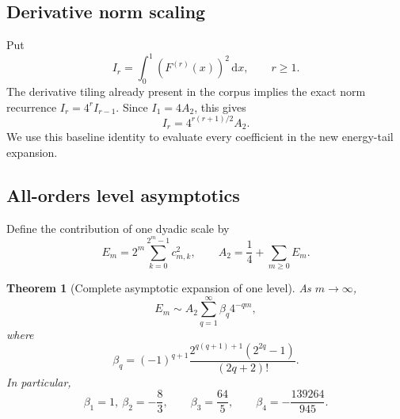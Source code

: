 \documentclass[11pt,oneside]{article}
\newtheorem{theorem}{Theorem}[section]
\theoremstyle{definition}
\newcommand{\dd}{\,\mathrm d}
\begin{document}
\subsection{Derivative norm scaling}

Put
\begin{equation}
 I_r=\int_0^1\left(F^{(r)}(x)\right)^2\dd x,
 \qquad r\ge1.                                           \label{p5:eq:Ir-definition}
\end{equation}
The derivative tiling already present in the corpus implies the exact norm
recurrence $I_r=4^rI_{r-1}$.  Since $I_1=4A_2$, this gives
\begin{equation}
 \boxed{\displaystyle
 I_r=4^{r(r+1)/2}A_2.}                                   \label{p5:eq:derivative-norm-scaling}
\end{equation}
We use this baseline identity to evaluate every coefficient in the new
energy-tail expansion.

\subsection{All-orders level asymptotics}

Define the contribution of one dyadic scale by
\begin{equation}
 E_m=2^m\sum_{k=0}^{2^m-1}c_{m,k}^2,
 \qquad A_2=\frac14+\sum_{m\ge0}E_m.                     \label{p5:eq:Em-definition}
\end{equation}

\begin{theorem}[Complete asymptotic expansion of one level]
\label{p5:thm:Em-asymptotic}
As $m\to\infty$,
\begin{equation}
 \boxed{\displaystyle
 E_m\sim A_2\sum_{q=1}^\infty\beta_q4^{-qm},}            \label{p5:eq:Em-asymptotic}
\end{equation}
where
\begin{equation}
 \boxed{\displaystyle
 \beta_q=(-1)^{q+1}
 \frac{2^{q(q+1)+1}(2^{2q}-1)}{(2q+2)!}.}                \label{p5:eq:beta-formula}
\end{equation}
In particular,
\begin{equation}
 \beta_1=1,\
 \beta_2=-\frac83,
 \qquad
 \beta_3=\frac{64}{5},
 \qquad
 \beta_4=-\frac{139264}{945}.                           \label{p5:eq:beta-first}
\end{equation}
\end{theorem}
\end{document}
